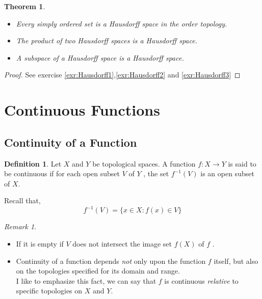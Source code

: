 \documentclass[
]{book}
\providecommand{\tightlist}{%
  \setlength{\itemsep}{0pt}\setlength{\parskip}{0pt}}
\newtheorem{theorem}{Theorem}[chapter]
\theoremstyle{definition}
\newtheorem{definition}{Definition}[chapter]
\theoremstyle{definition}
\theoremstyle{definition}
\theoremstyle{definition}
\theoremstyle{remark}
\newtheorem*{remark}{Remark}
\begin{document}
\begin{theorem}
\protect\hypertarget{thm:unnamed-chunk-91}{}\label{thm:unnamed-chunk-91}\leavevmode

\begin{itemize}
\tightlist
\item
  Every simply ordered set is a Hausdorff space in the order topology.
\item
  The product of two Hausdorff spaces is a Hausdorff space.
\item
  A subspace of a Hausdorff space is a Hausdorff space.
\end{itemize}

\end{theorem}

\begin{proof}
See exercise \ref{exr:Hausdorff1},\ref{exr:Hausdorff2} and \ref{exr:Hausdorff3}
\end{proof}

\hypertarget{continuous-functions}{%
\section{Continuous Functions}\label{continuous-functions}}

\hypertarget{continuity-of-a-function}{%
\subsection{Continuity of a Function}\label{continuity-of-a-function}}

\begin{definition}
\protect\hypertarget{def:unnamed-chunk-93}{}\label{def:unnamed-chunk-93}Let \(X\) and \(Y\) be topological spaces. A function \(f : X \to Y\) is said to be continuous if for each open subset \(V\) of \(Y\) , the set \(f^{−1}(V)\) is an open subset of \(X\).
\end{definition}

Recall that,
\[f^{ −1}(V)=\{x\in X: f(x)\in V\}\]

\begin{remark}
\leavevmode

\begin{itemize}
\tightlist
\item
  If it is empty if \(V\) does not intersect the image set \(f (X)\) of \(f\) .
\item
  Continuity of a function depends \emph{not} only upon the function \(f\) itself, but also on the topologies specified for its domain and range.\\
  I like to emphasize this fact, we can say that \(f\) is continuous \emph{relative} to specific topologies on \(X\) and \(Y\).
\end{itemize}

\end{remark}
\end{document}
